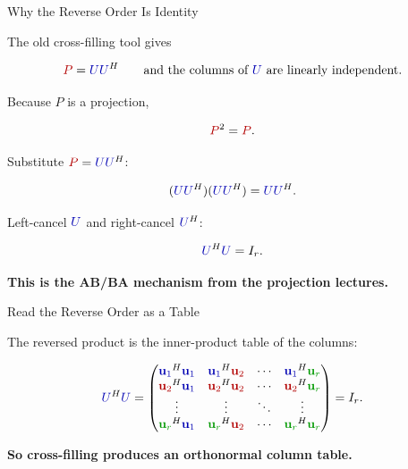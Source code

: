 \documentclass[10pt]{beamer}
\theoremstyle{definition}
\newcommand{\x}[1]{\alert{\textbf{#1}}}
\newcommand{\rd}[1]{{\color{red!70!black}#1}}
\newcommand{\bl}[1]{{\color{blue!70!black}#1}}
\newcommand{\gn}[1]{{\color{green!60!black}#1}}
\begin{document}
\begin{frame}[shrink=6]{Why the Reverse Order Is Identity}

The old cross-filling tool gives

$$
\rd{P}=\bl{U}\bl{U}^H
\qquad\text{and the columns of }\bl{U}\text{ are linearly independent.}
$$

\vfill\pause

Because $P$ is a projection,

$$
\rd{P}^2=\rd{P}.
$$

\vfill\pause

Substitute $\rd{P}=\bl{U}\bl{U}^H$:

$$
(\bl{U}\bl{U}^H)(\bl{U}\bl{U}^H)=\bl{U}\bl{U}^H.
$$

\vfill\pause

Left-cancel $\bl{U}$ and right-cancel $\bl{U}^H$:

$$
\bl{U}^H\bl{U}=I_r.
$$

\x{This is the AB/BA mechanism from the projection lectures.}

\end{frame}


\begin{frame}[shrink=6]{Read the Reverse Order as a Table}

The reversed product is the inner-product table of the columns:

$$
\bl{U}^H\bl{U}=
\begin{pmatrix}
\bl{\mathbf u_1}^H\bl{\mathbf u_1} &
\bl{\mathbf u_1}^H\rd{\mathbf u_2} &
\cdots &
\bl{\mathbf u_1}^H\gn{\mathbf u_r}\\
\rd{\mathbf u_2}^H\bl{\mathbf u_1} &
\rd{\mathbf u_2}^H\rd{\mathbf u_2} &
\cdots &
\rd{\mathbf u_2}^H\gn{\mathbf u_r}\\
\vdots&\vdots&\ddots&\vdots\\
\gn{\mathbf u_r}^H\bl{\mathbf u_1} &
\gn{\mathbf u_r}^H\rd{\mathbf u_2} &
\cdots &
\gn{\mathbf u_r}^H\gn{\mathbf u_r}
\end{pmatrix}
=I_r.
$$

\vfill

\x{So cross-filling produces an orthonormal column table.}

\end{frame}
\end{document}
